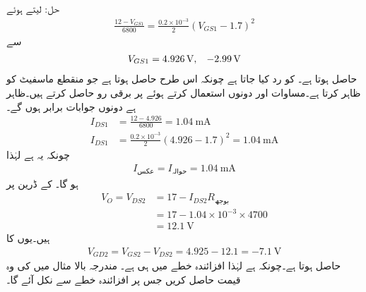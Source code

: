 حل: لیتے ہوئے
\begin{align*}
\frac{12-V_{GS1}}{6800}=\frac{0.2 \times 10^{-3}}{2} \left(V_{GS1}-1.7 \right)^2
\end{align*}
سے
\begin{align*}
V_{GS1}=\SI{4.926}{\volt}, \hspace{3mm} \SI{-2.99}{\volt}
\end{align*}
 حاصل ہوتا ہے۔ کو رد کیا جاتا ہے چونکہ اس طرح  حاصل ہوتا ہے جو منقطع ماسفیٹ کو ظاہر کرتا ہے۔مساوات  اور  دونوں استعمال کرتے ہوئے  پر برقی رو حاصل کرتے ہیں۔ظاہر ہے دونوں جوابات برابر ہوں گے۔
\begin{align*}
I_{DS1}&=\frac{12-4.926}{6800}=\SI{1.04}{\milli \ampere}\\
I_{DS1}&=\frac{0.2 \times 10^{-3}}{2} \left(4.926-1.7 \right)^2=\SI{1.04}{\milli \ampere}
\end{align*}
چونکہ یہ  ہے لہٰذا
\begin{align*}
I_{\textrm{عکس}}=I_{\textrm{حوالہ}}=\SI{1.04}{\milli \ampere}
\end{align*}
ہو گا۔ کے ڈرین پر
\begin{align*}
V_O=V_{DS2}&=17-I_{DS2} R_{\textrm{بوجھ} }\\
&=17- 1.04 \times 10^{-3} \times 4700\\
&=\SI{12.1}{\volt}
\end{align*}
ہیں۔یوں  کا 
\begin{align*}
V_{GD2}=V_{GS2}-V_{DS2}=4.925-12.1=\SI{-7.1}{\volt}
\end{align*}
حاصل ہوتا ہے۔چونکہ  ہے لہٰذا  افزائندہ خطے میں ہی ہے۔
مندرجہ بالا مثال میں  کی وہ قیمت حاصل کریں جس پر  افزائندہ خطے سے نکل آئے گا۔

